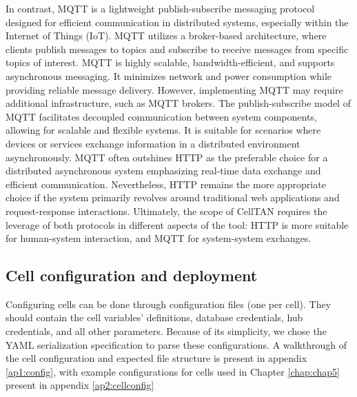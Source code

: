 In contrast, MQTT is a lightweight publish-subscribe messaging protocol designed for efficient communication in distributed systems, especially within the Internet of Things (IoT). MQTT utilizes a broker-based architecture, where clients publish messages to topics and subscribe to receive messages from specific topics of interest. MQTT is highly scalable, bandwidth-efficient, and supports asynchronous messaging. It minimizes network and power consumption while providing reliable message delivery. However, implementing MQTT may require additional infrastructure, such as MQTT brokers.
The publish-subscribe model of MQTT facilitates decoupled communication between system components, allowing for scalable and flexible systems. It is suitable for scenarios where devices or services exchange information in a distributed environment asynchronously. MQTT often outshines HTTP as the preferable choice for a distributed asynchronous system emphasizing real-time data exchange and efficient communication. Nevertheless, HTTP remains the more appropriate choice if the system primarily revolves around traditional web applications and request-response interactions. Ultimately, the scope of CellTAN requires the leverage of both protocols in different aspects of the tool: HTTP is more suitable for human-system interaction, and MQTT for system-system exchanges.


\subsection{Cell configuration and deployment} \label{subsec:cellconfig}

Configuring cells can be done through configuration files (one per cell). They should contain the cell variables' definitions, database credentials, hub credentials, and all other parameters. Because of its simplicity, we chose the YAML serialization specification \cite{yaml} to parse these configurations. A walkthrough of the cell configuration and expected file structure is present in appendix \ref{ap1:config}, with example configurations for cells used in Chapter \ref{chap:chap5} present in appendix \ref{ap2:cellconfig}


